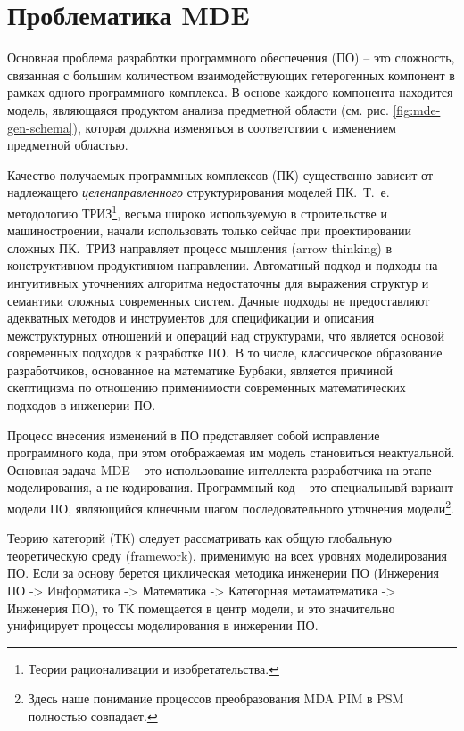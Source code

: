 \documentclass[12pt,a4paper]{extarticle}
\begin{document}
\section{Проблематика MDE}
\label{sec:problem-mde}

Основная проблема разработки программного обеспечения (ПО) -- это сложность,
связанная с большим количеством взаимодействующих гетерогенных компонент в
рамках одного программного комплекса.  В основе каждого компонента находится
модель, являющаяся продуктом анализа предметной области (см. рис.
\ref{fig:mde-gen-schema}), которая должна изменяться в соответствии с изменением
предметной областью.

Качество получаемых программных комплексов (ПК) существенно зависит от
надлежащего \emph{целенаправленного} структурирования моделей ПК.~Т.~е.
методологию ТРИЗ\footnote{Теории рационализации и изобретательства.}, весьма
широко используемую в строительстве и машиностроении, начали использовать только
сейчас при проектировании сложных ПК.~ТРИЗ направляет процесс мышления (arrow
thinking) в конструктивном продуктивном направлении. Автоматный подход и подходы
на интуитивных уточнениях алгоритма недостаточны для выражения структур и
семантики сложных современных систем. Дачные подходы не предоставляют адекватных
методов и инструментов для спецификации и описания межструктурных отношений и
операций над структурами, что является основой современных подходов к разработке
ПО.~В то числе, классическое образование разработчиков, основанное на математике
Бурбаки, является причиной скептицизма по отношению применимости современных
математических подходов в инженерии ПО.

Процесс внесения изменений в ПО представляет собой исправление программного
кода, при этом отображаемая им модель становиться неактуальной.  Основная задача
MDE -- это использование интеллекта разработчика на этапе моделирования, а не
кодирования. Программный код -- это специальнывй вариант модели ПО, являющийся
клнечным шагом последовательного уточнения модели\footnote{Здесь наше понимание
 процессов преобразования MDA PIM в PSM полностью совпадает.}.

Теорию категорий (ТК) следует рассматривать как общую глобальную
теоретическую среду (framework), применимую на всех уровнях моделирования ПО.
Если за основу берется циклическая методика инженерии ПО (Инжерения ПО ->
Информатика -> Математика -> Категорная метаматематика -> Инженерия ПО), то ТК
помещается в центр модели, и это значительно унифицирует процессы моделирования
в инжерении ПО.
\end{document}
